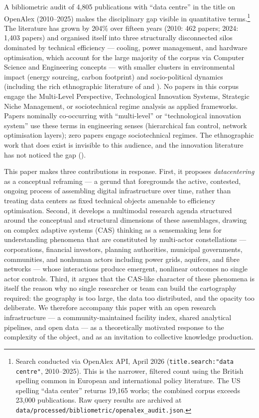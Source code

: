 A bibliometric audit of 4,805 publications with ``data centre'' in the title on OpenAlex (2010--2025) makes the disciplinary gap visible in quantitative terms.\footnote{Search conducted via OpenAlex API, April 2026 (\texttt{title.search:"data centre"}, 2010--2025). This is the narrower, filtered count using the British spelling common in European and international policy literature. The US spelling ``data center'' returns 19,165 works; the combined corpus exceeds 23,000 publications. Raw query results are archived at \texttt{data/processed/bibliometric/openalex\_audit.json}.} The literature has grown by 204\% over fifteen years (2010: 462 papers; 2024: 1,403 papers) and organised itself into three structurally disconnected silos dominated by technical efficiency --- cooling, power management, and hardware optimisation, which account for the large majority of the corpus via Computer Science and Engineering concepts --- with smaller clusters in environmental impact (energy sourcing, carbon footprint) and socio-political dynamics (including the rich ethnographic literature of \citet{vonderau2019storing} and \citet{holt2015vonderau}). No papers in this corpus engage the Multi-Level Perspective, Technological Innovation Systems, Strategic Niche Management, or sociotechnical regime analysis as applied frameworks. Papers nominally co-occurring with ``multi-level'' or ``technological innovation system'' use these terms in engineering senses (hierarchical fan control, network optimisation layers); zero papers engage sociotechnical regimes. The ethnographic work that does exist is invisible to this audience, and the innovation literature has not noticed the gap ().



This paper makes three contributions in response. First, it proposes \textit{datacentering} as a conceptual reframing — a gerund that foregrounds the active, contested, ongoing process of assembling digital infrastructure over time, rather than treating data centers as fixed technical objects amenable to efficiency optimisation. Second, it develops a multimodal research agenda structured around the conceptual and structural dimensions of these assemblages, drawing on complex adaptive systems (CAS) thinking \citep{phillips2019complex} as a sensemaking lens for understanding phenomena that are constituted by multi-actor constellations — corporations, financial investors, planning authorities, municipal governments, communities, and nonhuman actors including power grids, aquifers, and fibre networks — whose interactions produce emergent, nonlinear outcomes no single actor controls. Third, it argues that the CAS-like character of these phenomena is itself the reason why no single researcher or team can build the cartography required: the geography is too large, the data too distributed, and the opacity too deliberate. We therefore accompany this paper with an open research infrastructure — a community-maintained facility index, shared analytical pipelines, and open data — as a theoretically motivated response to the complexity of the object, and as an invitation to collective knowledge production.

